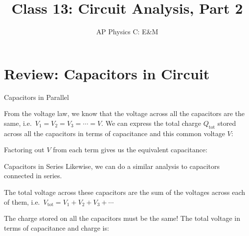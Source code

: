 \documentclass[12pt,aspectratio=169]{beamer}
\title{Class 13: Circuit Analysis, Part 2}
\subtitle{AP Physics C: E\&M}
\begin{document}
\begin{frame}
  \maketitle
\end{frame}



\section{Review: Capacitors in Circuit}

\begin{frame}{Capacitors in Parallel}
  \begin{center}
  \end{center}
  From the voltage law, we know that the voltage across all the capacitors are
  the same, i.e.\ $V_1=V_2=V_3=\cdots=V$. We can express the total charge
  $Q_\text{tot}$ stored across all the capacitors in terms of capacitance and
  this common voltage $V$: 

  
  Factoring out $V$ from each term gives us the equivalent capacitance:

\end{frame}



\begin{frame}{Capacitors in Series}
  Likewise, we can do a similar analysis to capacitors connected in series.
  \begin{center}
  \end{center}
  The total voltage across these capacitors are the sum of the voltages across
  each of them, i.e.\ $V_\text{tot}=V_1+V_2+V_3+\cdots$
  
  \vspace{.1in}The charge stored on all the capacitors must be the same! The
  total voltage in terms of capacitance and charge is:

\end{frame}
\end{document}
